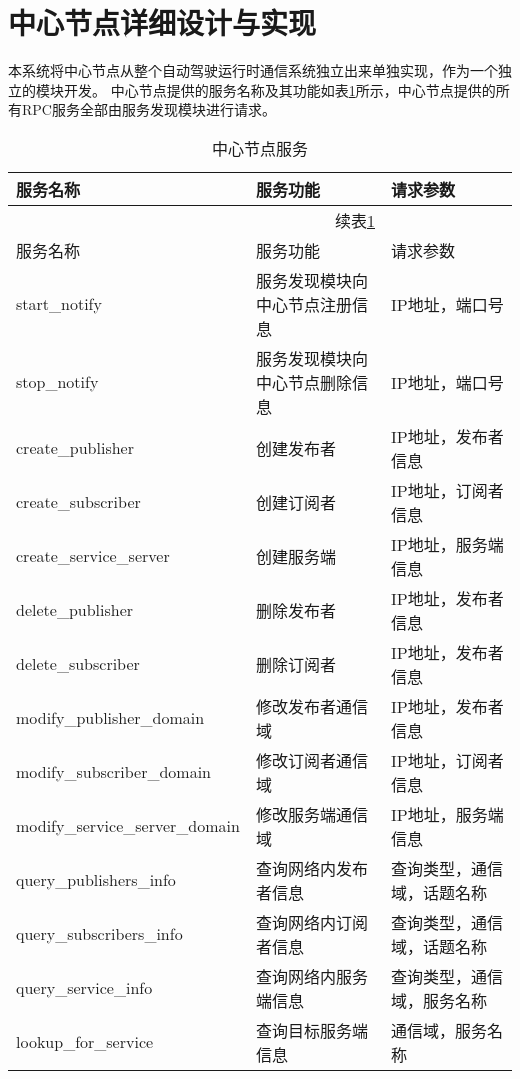 \section{中心节点详细设计与实现}
本系统将中心节点从整个自动驾驶运行时通信系统独立出来单独实现，作为一个独立的模块开发。
中心节点提供的服务名称及其功能如表\ref{master}所示，中心节点提供的所有RPC服务全部由服务发现模块进行请求。


\begin{longtable}{lll}
  \caption{中心节点服务}\label{master}\\
  \toprule
  服务名称 & 服务功能 & 请求参数\\
  \midrule
  \endfirsthead
  \multicolumn{2}{r}{续表\ref{master}}\\
  \toprule
  服务名称 & 服务功能 & 请求参数\\
  \hline
  \endhead
  \endfoot
  \bottomrule
  \endlastfoot

  start\_notify & 服务发现模块向中心节点注册信息 & IP地址，端口号\\
  stop\_notify & 服务发现模块向中心节点删除信息 & IP地址，端口号\\
  create\_publisher & 创建发布者 & IP地址，发布者信息\\
  create\_subscriber & 创建订阅者 & IP地址，订阅者信息\\
  create\_service\_server & 创建服务端 & IP地址，服务端信息\\
  delete\_publisher & 删除发布者 & IP地址，发布者信息\\
  \hline
  delete\_subscriber & 删除订阅者 & IP地址，发布者信息\\
  modify\_publisher\_domain & 修改发布者通信域 & IP地址，发布者信息\\
  modify\_subscriber\_domain & 修改订阅者通信域 & IP地址，订阅者信息\\
  modify\_service\_server\_domain & 修改服务端通信域 & IP地址，服务端信息\\
  query\_publishers\_info & 查询网络内发布者信息 & 查询类型，通信域，话题名称\\
  query\_subscribers\_info & 查询网络内订阅者信息 & 查询类型，通信域，话题名称\\
  query\_service\_info & 查询网络内服务端信息 & 查询类型，通信域，服务名称\\
  lookup\_for\_service & 查询目标服务端信息 & 通信域，服务名称\\
  \end{longtable}  

